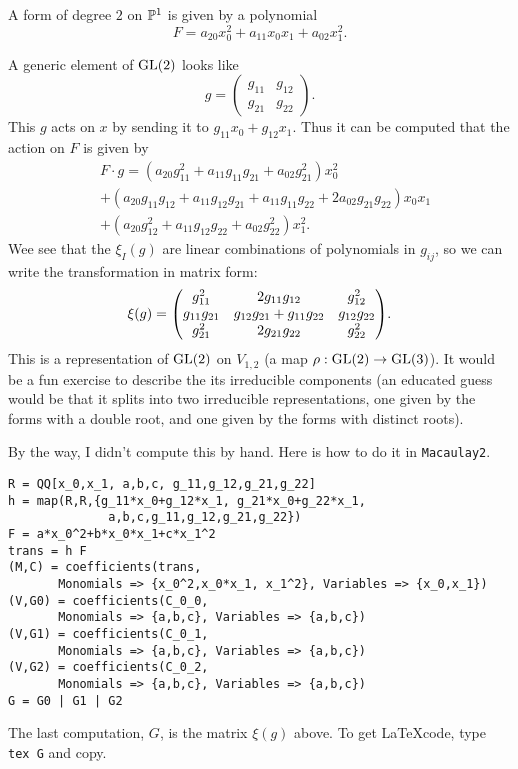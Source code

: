 \documentclass[11pt, english]{article}
\begin{document}
\begin{example}[Pairs of points on the Riemann sphere, $d=2$, $n=2$]
A form of degree $2$ on $\mathbb{P}^1$ is given by a polynomial $$F=a_{20}x_0^2 + a_{11}x_0x_1+a_{02}x_1^2.$$

A generic element of $\operatorname{GL}(2)$ looks like
$$
g = \begin{pmatrix} g_{11} & g_{12} \\
g_{21} & g_{22}
\end{pmatrix}.
$$
This $g$ acts on $x$ by sending it to $g_{11}x_0+g_{12}x_1$. Thus it can be computed that the action on $F$ is given by
\begin{align*}
& F \cdot g = (a_{20} {g}_{11}^{2}+a_{11} {g}_{11} {g}_{21}+a_{02} {g}_{21}^{2} )x_0^2 \\
&+ (a_{20} {g}_{11} {g}_{12}+a_{11} {g}_{12} {g}_{21}+a_{11} {g}_{11} {g}_{22}+2 a_{02}
      {g}_{21} {g}_{22})x_0x_1 \\
&+  (a_{20} {g}_{12}^{2}+a_{11} {g}_{12} {g}_{22}+a_{02} {g}_{22}^{2})x_1^2.
\end{align*}
Wee see that the $\xi_I(g)$ are linear combinations of polynomials in $g_{ij}$, so we can write the transformation in matrix form:
$$ \xi(g) =
\bgroup\begin{pmatrix}{g}_{11}^{2}&
      2 {g}_{11} {g}_{12}&
      {g}_{12}^{2}\\
      {g}_{11} {g}_{21}&
      {g}_{12} {g}_{21}+{g}_{11} {g}_{22}&
      {g}_{12} {g}_{22}\\
      {g}_{21}^{2}&
      2 {g}_{21} {g}_{22}&
      {g}_{22}^{2}\\
      \end{pmatrix}\egroup.
$$
This is a representation of $\operatorname{GL}(2)$ on $V_{1,2}$ (a map $\rho:\operatorname{GL}(2) \to \operatorname{GL}(3)$). It would be a fun exercise to describe the its irreducible components (an educated guess would be that it splits into two irreducible representations, one given by the forms with a double root, and one given by the forms with distinct roots).

By the way, I didn't compute this by hand. Here is how to do it in \verb|Macaulay2|.
\begin{verbatim}
R = QQ[x_0,x_1, a,b,c, g_11,g_12,g_21,g_22]
h = map(R,R,{g_11*x_0+g_12*x_1, g_21*x_0+g_22*x_1,
              a,b,c,g_11,g_12,g_21,g_22})
F = a*x_0^2+b*x_0*x_1+c*x_1^2
trans = h F
(M,C) = coefficients(trans,
       Monomials => {x_0^2,x_0*x_1, x_1^2}, Variables => {x_0,x_1})
(V,G0) = coefficients(C_0_0,
       Monomials => {a,b,c}, Variables => {a,b,c})
(V,G1) = coefficients(C_0_1,
       Monomials => {a,b,c}, Variables => {a,b,c})
(V,G2) = coefficients(C_0_2,
       Monomials => {a,b,c}, Variables => {a,b,c})
G = G0 | G1 | G2
\end{verbatim}
The last computation, $G$, is the matrix $\xi(g)$ above. To get \LaTeX code, type \verb|tex G| and copy.
\end{example}
\end{document}
